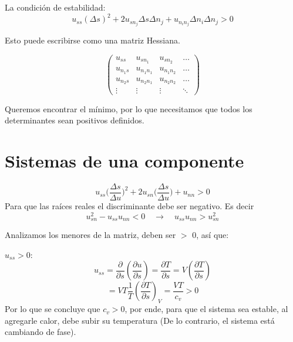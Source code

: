 \documentclass[10pt,twocolumn]{IEEEtran2e}
\begin{document}
La condici\'on de estabilidad:
\begin{equation}
 u_{ss}(\Delta s)^{2} + 2 u_{sn_{j}}\Delta s \Delta n_{j} + u_{n_{i}n_{j}} \Delta n_{i} \Delta n_{j} > 0
\end{equation}

Esto puede escribirse como una matriz Hessiana.

 \begin{displaymath}
\left( \begin{array}{cccc}
u_{ss} & u_{sn_{1}} & u_{sn_{2}} & \ldots \\
u_{n_{1}s} & u_{n_{1}n_{1}} & u_{n_{1}n_{2}} & \ldots \\
u_{n_{2}s} & u_{n_{2}n_{1}} & u_{n_{2}n_{2}} & \ldots \\
\vdots & \vdots & \vdots & \ddots
\end{array} \right)
\end{displaymath}

Queremos encontrar el m\'inimo, por lo que necesitamos que todos los determinantes sean positivos definidos.

\section{Sistemas de una componente}

\begin{equation}
 u_{ss}\bigg( \frac{\Delta s}{\Delta u} \bigg)^{2} + 2 u_{sn}\bigg( \frac{\Delta s}{\Delta u} \bigg) + u_{nn} > 0
\end{equation}
 Para que las ra\'ices reales el discriminante debe ser negativo. Es decir
\begin{equation}
 u^{2}_{sn} - u_{ss} u_{nn} < 0 \quad \rightarrow \quad u_{ss}u_{nn}>u^{2}_{sn}
\end{equation}

Analizamos los menores de la matriz, deben ser $>$ 0, as\'i que:

 $u_{ss}>0$:
\begin{equation}
 u_{ss}=\frac{\partial}{\partial s}\left(\frac{\partial u}{\partial s} \right)=\frac{\partial T}{\partial s}=V\left(\frac{\partial T}{\partial s} \right)\nonumber
\end{equation}
\begin{equation}
 =VT\frac{1}{T}\left(\frac{\partial T}{\partial s} \right)_V=\frac{VT}{c_v}>0
\end{equation}
Por lo que se concluye que $c_v>0$, por ende, para que el sistema sea estable, al agregarle calor, debe subir su temperatura (De lo contrario, el sistema est\'a cambiando de fase).
\end{document}
